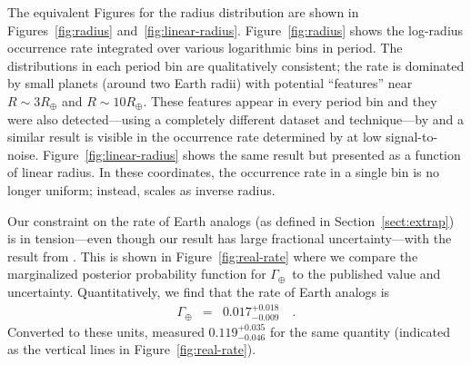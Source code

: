 \documentclass[12pt,preprint]{aastex}
\newcommand{\figref}[1]{\ref{fig:#1}}
\newcommand{\Fig}[1]{Figure~\figref{#1}}
\newcommand{\fig}[1]{\Fig{#1}}
\newcommand{\Sect}[1]{Section~\ref{sect:#1}}
\newcommand{\sect}[1]{\Sect{#1}}
\newcommand{\rate}{\ensuremath{\Gamma}}
\newcommand{\radius}{\ensuremath{R}}
\newcommand{\gammaearth}{{\ensuremath{\rate_\oplus}}}
\begin{document}
The equivalent Figures for the radius distribution are shown in
Figures~\figref{radius} and~\figref{linear-radius}.
\Fig{radius} shows the log-radius occurrence rate integrated over various
logarithmic bins in period.
The distributions in each period bin are qualitatively consistent; the
rate is dominated by small planets (around two Earth radii) with potential
``features'' near $\radius\sim3\radius_\oplus$ and $\radius\sim
10\radius_\oplus$.
These features appear in every period bin and they were also detected---using
a completely different dataset and technique---by \citet{dong} and a similar
result is visible in the occurrence rate determined by \citet[][their Figure
7]{fressin-fp} at low signal-to-noise.
\Fig{linear-radius} shows the same result but presented as a function of
linear radius.
In these coordinates, the occurrence rate in a single bin is no longer
uniform; instead, scales as inverse radius.

Our constraint on the rate of Earth analogs (as defined in \sect{extrap}) is
in tension---even though our result has large fractional uncertainty---with
the result from \citet{petigura}.
This is shown in \fig{real-rate} where we compare the marginalized posterior
probability function for \gammaearth\ to the published value and uncertainty.
Quantitatively, we find that the rate of Earth analogs is
\begin{eqnarray}
\gammaearth &=& 0.017^{+0.018}_{-0.009} \quad.
\end{eqnarray}
Converted to these units, \citet{petigura} measured $0.119_{-0.046}^{+0.035}$
for the same quantity (indicated as the vertical lines in \fig{real-rate}).
\end{document}
